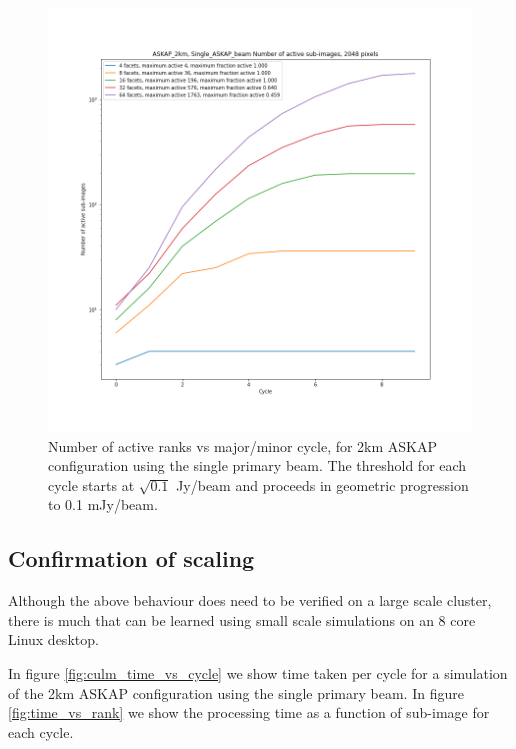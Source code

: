\documentclass[11pt,a4paper,variablewidth]{article}
\begin{document}
\begin{figure}[H]
  \centering
  \includegraphics[width=\textwidth]{./pngs/number_active_Single_ASKAP_beam_ASKAP_2km_2048.png}
  \caption{Number of active ranks vs major/minor cycle, for 2km ASKAP configuration using the single primary beam. The threshold for each cycle starts at $\sqrt{0.1}$ Jy/beam and proceeds in geometric progression to 0.1 mJy/beam.}
  \label{fig:number_active_ASKAP_2km}
\end{figure}

\subsection{Confirmation of scaling}

Although the above behaviour does need to be verified on a large scale cluster, there is much that can be learned using small scale simulations on an 8 core Linux desktop.

In figure \ref{fig:culm_time_vs_cycle} we show time taken per cycle for a simulation of the 2km ASKAP configuration using the single primary beam. In figure \ref{fig:time_vs_rank} we show the processing time as a function of sub-image for each cycle.
\end{document}
